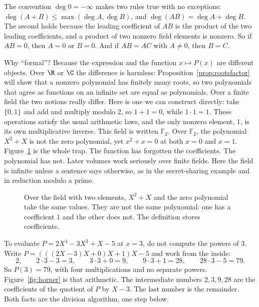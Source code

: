 The convention $\deg0=-\infty$ makes two rules true with no exceptions: $\deg(A+B)\le\max(\deg A,\deg B)$, and $\deg(AB)=\deg A+\deg B$. The second holds because the leading coefficient of $AB$ is the product of the two leading coefficients, and a product of two nonzero field elements is nonzero. So if $AB=0$, then $A=0$ or $B=0$. And if $AB=AC$ with $A\ne0$, then $B=C$.

Why ``formal''? Because the expression and the function $x\mapsto P(x)$ are different objects. Over $\R$ or $\C$ the difference is harmless: Proposition~\ref{prop:rootsfactor} will show that a nonzero polynomial has finitely many roots, so two polynomials that agree as functions on an infinite set are equal as polynomials. Over a finite field the two notions really differ. Here is one we can construct directly: take $\{0,1\}$ and add and multiply modulo $2$, so $1+1=0$, while $1\cdot1=1$. These operations satisfy the usual arithmetic laws, and the only nonzero element, $1$, is its own multiplicative inverse. This field is written $\mathbb F_2$. Over $\mathbb F_2$, the polynomial $X^2+X$ is not the zero polynomial, yet $x^2+x=0$ at both $x=0$ and $x=1$. Figure~\ref{fig:values} is the whole trap. The function has forgotten the coefficients. The polynomial has not. Later volumes work seriously over finite fields. Here the field is infinite unless a sentence says otherwise, as in the secret-sharing example and in reduction modulo a prime.

\begin{figure}[ht]
\centering
{}
\caption{Over the field with two elements, $X^2+X$ and the zero polynomial take the same values. They are not the same polynomial: one has a coefficient $1$ and the other does not. The definition stores coefficients.}
\label{fig:values}
\end{figure}

\begin{examplex}
To evaluate $P=2X^4-3X^3+X-5$ at $x=3$, do not compute the powers of $3$. Write $P=(((2X-3)X+0)X+1)X-5$ and work from the inside:
\[
2,\qquad 2\cdot3-3=3,\qquad 3\cdot3+0=9,\qquad 9\cdot3+1=28,\qquad 28\cdot3-5=79.
\]
So $P(3)=79$, with four multiplications and no separate powers. Figure~\ref{fig:horner} is that arithmetic. The intermediate numbers $2,3,9,28$ are the coefficients of the quotient of $P$ by $X-3$. The last number is the remainder. Both facts are the division algorithm, one step below.
\end{examplex}

